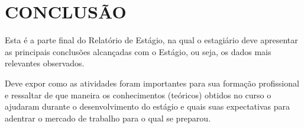 \chapter{CONCLUSÃO}\label{modelo}
\vspace*{-2cm}

Esta é a parte final do Relatório de Estágio, na qual o estagiário deve apresentar as
principais conclusões alcançadas com o Estágio, ou seja, os dados mais relevantes
observados.

Deve expor como as atividades foram importantes para sua formação profissional e
ressaltar de que maneira os conhecimentos (teóricos) obtidos no curso o ajudaram durante o desenvolvimento do estágio e quais suas expectativas para adentrar o mercado de trabalho para o qual se preparou.
